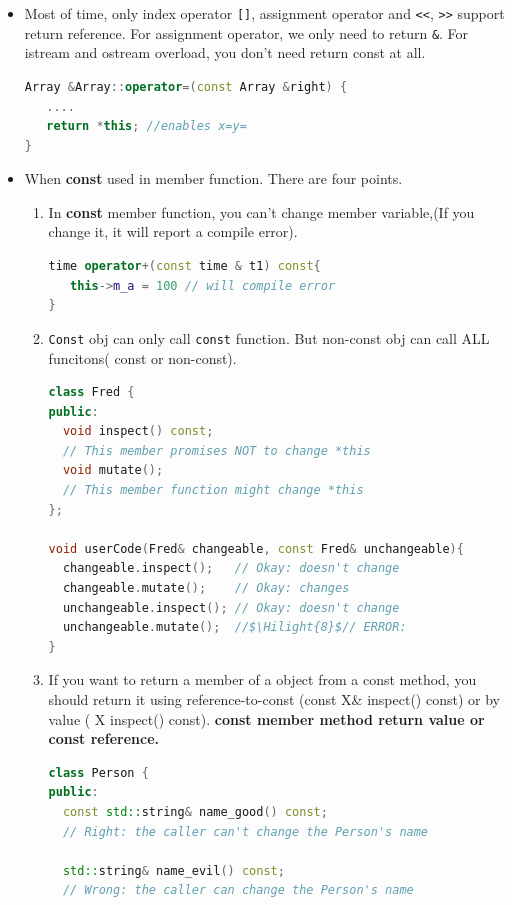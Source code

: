\documentclass[a4paper,12pt,twoside]{book}
\newcommand{\Hilight}[1]{\makebox[0pt][l]{\color{yellow}\rule[-3pt]{#1em}{11pt}}}
\begin{document}
\begin{itemize}
\item Most of time, only index operator \verb=[]=, assignment operator and \texttt{<<}, \texttt{>>} support return reference. For assignment operator, we only need to return \texttt{\&}.  For istream and ostream overload, you don't need return const at all. 
\begin{lstlisting}[frame=single, language=c++]
Array &Array::operator=(const Array &right) {
   ....
   return *this; //enables x=y= 
}
\end{lstlisting}

\item When \textbf{const} used in member function. There are four points.
\begin{enumerate}
\item In \textbf{const} member function, you can't change member variable,(If you change it, it will report a compile error).
\begin{lstlisting}[frame=single, language=c++]
time operator+(const time & t1) const{
   this->m_a = 100 // will compile error
}
\end{lstlisting}

\item \texttt{Const} obj can only call \texttt{const} function. But non-const obj can call ALL funcitons( const or non-const).
\begin{lstlisting}[frame=single, language=c++, mathescape=true]
class Fred {
public:
  void inspect() const;
  // This member promises NOT to change *this
  void mutate();
  // This member function might change *this
};

void userCode(Fred& changeable, const Fred& unchangeable){
  changeable.inspect();   // Okay: doesn't change
  changeable.mutate();    // Okay: changes
  unchangeable.inspect(); // Okay: doesn't change
  unchangeable.mutate();  //$\Hilight{8}$// ERROR:
}
\end{lstlisting}

\item If you want to return a member of a object from a const method, you should return it using reference-to-const (const X\& inspect() const) or by value ( X inspect() const). \textbf{const member method return value or const reference.}
\begin{lstlisting}[frame=single, language=c++]
class Person {
public:
  const std::string& name_good() const;
  // Right: the caller can't change the Person's name

  std::string& name_evil() const;
  // Wrong: the caller can change the Person's name


\end{lstlisting}
\end{enumerate}
\end{itemize}
\end{document}
